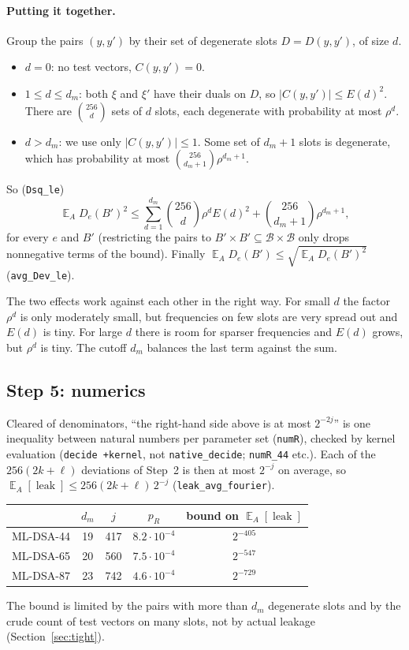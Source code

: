 \documentclass[11pt]{article}
\theoremstyle{definition}
\theoremstyle{remark}
\newcommand{\E}{\mathop{\mathbb{E}}}
\newcommand{\leak}{\operatorname{leak}}
\newcommand{\lean}[1]{\texttt{#1}}
\begin{document}
\paragraph{Putting it together.}
Group the pairs $(y,y')$ by their set of degenerate slots $D = D(y,y')$, of size $d$.
\begin{itemize}
  \item $d=0$: no test vectors, $C(y,y')=0$.
  \item $1\le d\le d_m$: both $\xi$ and $\xi'$ have their duals on $D$, so
        $|C(y,y')|\le E(d)^2$. There are $\binom{256}{d}$ sets of $d$ slots, each degenerate with
        probability at most $\rho^d$.
  \item $d>d_m$: we use only $|C(y,y')|\le1$. Some set of $d_m+1$ slots is degenerate, which has
        probability at most $\binom{256}{d_m+1}\rho^{d_m+1}$.
\end{itemize}
So (\lean{Dsq\_le})
\[
  \E_A D_e(B')^2 \le \sum_{d=1}^{d_m}\binom{256}{d}\rho^d E(d)^2 + \binom{256}{d_m+1}\rho^{d_m+1},
\]
for every $e$ and $B'$ (restricting the pairs to $B'\times B'\subseteq\mathcal B\times\mathcal B$
only drops nonnegative terms of the bound). Finally
$\E_A D_e(B') \le \sqrt{\E_A D_e(B')^2}$ (\lean{avg\_Dev\_le}).

The two effects work against each other in the right way. For small $d$ the factor $\rho^d$ is
only moderately small, but frequencies on few slots are very spread out and $E(d)$ is tiny. For
large $d$ there is room for sparser frequencies and $E(d)$ grows, but $\rho^d$ is tiny. The cutoff
$d_m$ balances the last term against the sum.

\subsection{Step 5: numerics}

Cleared of denominators, ``the right-hand side above is at most $2^{-2j}$'' is one inequality
between natural numbers per parameter set (\lean{numR}), checked by kernel evaluation
(\lean{decide +kernel}, not \lean{native\_decide}; \lean{numR\_44} etc.). Each of the
$256(2k+\ell)$ deviations of Step~2 is then at most $2^{-j}$ on average, so
$\E_A[\leak] \le 256(2k + \ell)\,2^{-j}$ (\lean{leak\_avg\_fourier}).

\begin{center}
\begin{tabular}{lcccc}
\toprule
 & $d_m$ & $j$ & $p_R$ & bound on $\E_A[\leak]$ \\
\midrule
ML-DSA-44 & 19 & 417 & $8.2\cdot10^{-4}$ & $2^{-405}$ \\
ML-DSA-65 & 20 & 560 & $7.5\cdot10^{-4}$ & $2^{-547}$ \\
ML-DSA-87 & 23 & 742 & $4.6\cdot10^{-4}$ & $2^{-729}$ \\
\bottomrule
\end{tabular}
\end{center}
The bound is limited by the pairs with more than $d_m$ degenerate slots and by the crude count of
test vectors on many slots, not by actual leakage (Section~\ref{sec:tight}).
\end{document}
